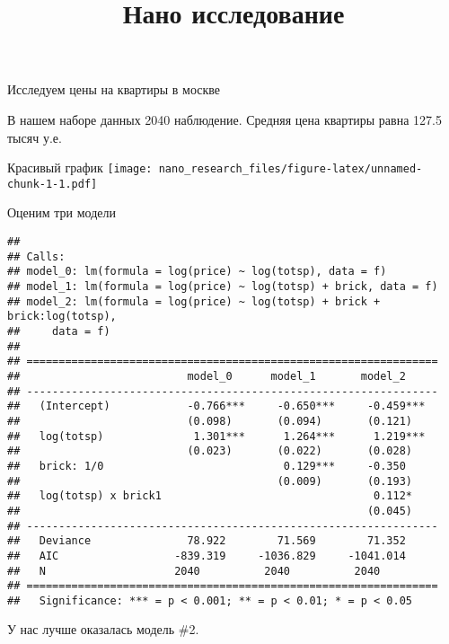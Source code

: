 \documentclass[
  russian,
]{article}
\title{Нано исследование}
\author{}
\date{\vspace{-2.5em}}
\begin{document}
\maketitle

Исследуем цены на квартиры в москве

В нашем наборе данных 2040 наблюдение. Средняя цена квартиры равна 127.5
тысяч у.е.

Красивый график
\texttt{[image: nano\_research\_files/figure-latex/unnamed-chunk-1-1.pdf]}

Оценим три модели

\begin{verbatim}
## 
## Calls:
## model_0: lm(formula = log(price) ~ log(totsp), data = f)
## model_1: lm(formula = log(price) ~ log(totsp) + brick, data = f)
## model_2: lm(formula = log(price) ~ log(totsp) + brick + brick:log(totsp), 
##     data = f)
## 
## ================================================================
##                          model_0      model_1       model_2     
## ----------------------------------------------------------------
##   (Intercept)            -0.766***     -0.650***     -0.459***  
##                          (0.098)       (0.094)       (0.121)    
##   log(totsp)              1.301***      1.264***      1.219***  
##                          (0.023)       (0.022)       (0.028)    
##   brick: 1/0                            0.129***     -0.350     
##                                        (0.009)       (0.193)    
##   log(totsp) x brick1                                 0.112*    
##                                                      (0.045)    
## ----------------------------------------------------------------
##   Deviance               78.922        71.569        71.352     
##   AIC                  -839.319     -1036.829     -1041.014     
##   N                    2040          2040          2040         
## ================================================================
##   Significance: *** = p < 0.001; ** = p < 0.01; * = p < 0.05
\end{verbatim}

У нас лучше оказалась модель \#2.
\end{document}
